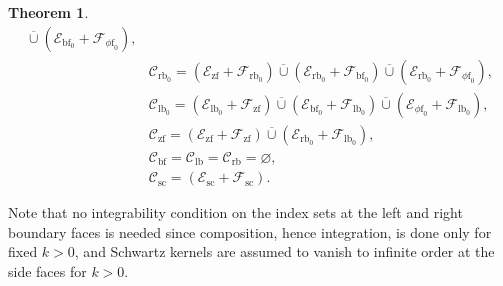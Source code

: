 \documentclass[JEP,XML,SOM,Unicode,NoFloatCountersInSection,published]{cedram}
\theoremstyle{plain}
\newtheorem{Th}{Theorem}[section]
\theoremstyle{definition}
\newcommand{\phif}{{\phi\mathrm{f}}}
\newcommand{\lf}{{\mathrm{lb}}}
\newcommand{\rf}{{\mathrm{rb}}}
\newcommand{\lfz}{{\mathrm{lb}_0}}
\newcommand{\rfz}{{\mathrm{rb}_0}}
\newcommand{\bbf}{{\mathrm{bf}}}
\newcommand{\bfz}{{\bbf_0}}
\newcommand{\ssc}{{\mathrm{sc}}}
\newcommand{\zf}{{\mathrm{zf}}}
\begin{document}
\begin{Th}
\begin{equation}
\begin{split}
\overline{\cup} (\mathcal{E}_{\bbf_0} + \mathcal{F}_{\phif_0}), \\
&\mathscr{C}_{\rfz} =
(\mathcal{E}_{\zf} + \mathcal{F}_{\rfz})
\overline{\cup} (\mathcal{E}_{\rfz}+ \mathcal{F}_{\bfz})
\overline{\cup} (\mathcal{E}_{\rfz}+\mathcal{F}_{\phif_0}),\\
&\mathscr{C}_{\lf_{0}} = (\mathcal{E}_{\lf_0}+
\mathcal{F}_{\zf}) \overline{\cup}
(\mathcal{E}_{\bfz}+\mathcal{F}_{\lfz}) \overline{\cup}
(\mathcal{E}_{\phif_0}+ \mathcal{F}_{\lfz}),\\
&\mathscr{C}_{\zf} = (\mathcal{E}_{\zf}+ \mathcal{F}_{\zf}) \overline{\cup}
(\mathcal{E}_{\rfz}+ \mathcal{F}_{\lfz}), \\
&\mathscr{C}_{\bbf} =
\mathscr{C}_{\lf} = \mathscr{C}_{\rf}
= \varnothing, \\
&\mathscr{C}_{\ssc} = (\mathcal{E}_{\ssc} + \mathcal{F}_{\ssc}).
\end{split}
\end{equation}
\end{Th}
{Note that no integrability condition on the index sets at the left and right boundary faces is needed since composition, hence integration, is done only for fixed $k>0$, and Schwartz kernels are assumed to vanish to infinite order at the side faces for $k>0$.}
\end{document}
